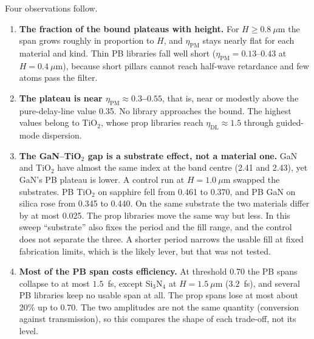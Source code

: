 \documentclass[preprint,12pt]{elsarticle}
\begin{document}
Four observations follow.
\begin{enumerate}
\item \textbf{The fraction of the bound plateaus with height.} For $H\ge0.8~\mu$m the span
      grows roughly in proportion to $H$, and $\eta_\mathrm{PM}$ stays nearly flat for each
      material and kind. Thin PB libraries fall well short ($\eta_\mathrm{PM}=0.13$--$0.43$
      at $H=0.4~\mu$m), because short pillars cannot reach half-wave retardance and few
      atoms pass the filter.
\item \textbf{The plateau is near $\eta_\mathrm{PM}\approx0.3$--$0.55$}, that is, near or
      modestly above the pure-delay-line value 0.35. No library approaches the bound.
      The highest values belong to TiO$_2$, whose prop libraries reach
      $\eta_\mathrm{DL}\approx1.5$ through guided-mode dispersion.
\item \textbf{The GaN--TiO$_2$ gap is a substrate effect, not a material one.} GaN and
      TiO$_2$ have almost the same index at the band centre (2.41 and 2.43), yet GaN's PB
      plateau is lower. A control run at $H=1.0~\mu$m swapped the substrates. PB TiO$_2$
      on sapphire fell from 0.461 to 0.370, and PB GaN on silica rose from 0.345 to 0.440.
      On the same substrate the two materials differ by at most 0.025. The prop libraries
      move the same way but less. In this sweep ``substrate'' also fixes the period and
      the fill range, and the control does not separate the three. A shorter period
      narrows the usable fill at fixed fabrication limits, which is the likely lever, but
      that was not tested.
\item \textbf{Most of the PB span costs efficiency.} At threshold 0.70 the PB spans
      collapse to at most $1.5$~fs, except Si$_3$N$_4$ at $H=1.5~\mu$m ($3.2$~fs), and
      several PB libraries keep no usable span at all. The prop spans lose at most about
      20\% up to 0.70.
      The two amplitudes are not the same quantity (conversion against transmission), so
      this compares the shape of each trade-off, not its level.
\end{enumerate}
\end{document}
